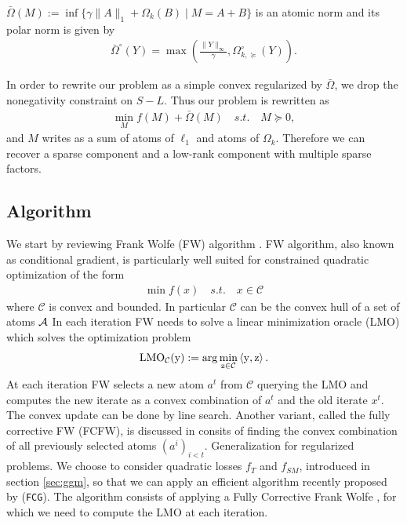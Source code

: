 \begin{lemm} $\bar{\Omega}(M):=\inf\{\gamma\|A\|_{1}+\Omega_k(B)\mid M=A+B\}$ is an atomic norm and its polar norm is given by 
\begin{align*}
{\bar{\Omega}^{\circ}}(Y)=\max\left(\frac{\|Y\|_{\infty}}{\gamma},\Omega_{k,\succeq}^{\circ}(Y)\right).
\end{align*}
\end{lemm}
In order to rewrite our problem as a simple convex regularized by $\bar{\Omega}$, we drop the nonegativity constraint on $S-L$. Thus our problem is rewritten as
\begin{align}
\label{opt_at}
\min_{M} f(M)+ \bar{\Omega}(M) \quad s.t. \quad M \succeq 0,
\end{align}
and $M$ writes as a sum of atoms of $\ell_1$ and atoms of $\Omega_k$. Therefore we can recover a sparse component and a low-rank component with multiple sparse factors.\\

\subsection{Algorithm}
We start by reviewing Frank Wolfe (FW) algorithm \citep{frank1956algorithm,LacosteFCFW}. 
FW algorithm, also known as conditional gradient, is particularly well suited for constrained quadratic optimization of the form
\begin{align*}
\min f(x) \quad s.t. \quad x\in \mathcal{C}
\end{align*}
where $\mathcal{C}$ is convex and bounded. In particular $\mathcal{C}$ can be the convex hull of a set of atoms $\mathcal{A}$  In each iteration FW needs to solve a linear minimization oracle (LMO) which solves the optimization problem
\begin{align}
\rm{{LMO}}_{\mathcal{C}}(y) := \arg\min_{z \in \mathcal{C}} \left\langle y,z \right\rangle.
\end{align}
At each iteration FW selects a new atom $a^t$ from $\mathcal{C}$ querying the LMO and computes the new iterate as a convex combination of $a^t$ and the old iterate $x^t$. The convex update can be done by line search. Another variant, called the fully corrective FW (FCFW), is discussed in \citet{LacosteFCFW} consits of finding the convex combination of all previously selected atoms $(a^i)_{i<t}$. 
 Generalization for regularized problems. We choose to consider quadratic losses $f_{T}$ and $f_{SM}$, introduced in section \ref{sec:ggm}, so that we can apply an efficient algorithm recently proposed by \citet{vinyes2017}(\texttt{FCG}). The algorithm consists of applying a Fully Corrective Frank Wolfe \citep{LacosteFCFW}, for which we need to compute the LMO at each iteration. 


